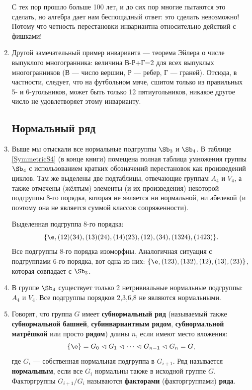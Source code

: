 \begin{enumerate}
С тех пор прошло больше 100 лет, и до сих пор многие пытаются это сделать, но алгебра дает нам беспощадный ответ: это сделать невозможно! Потому что четность перестановки инвариантна относительно действий с фишками!

\item Другой замечательный пример инварианта --- теорема Эйлера о числе выпуклого многогранника: величина В-Р+Г=2 для всех выпуклых многогранников (В --- число вершин, Р --- ребер, Г --- граней). Отсюда, в частности, следует, что на футбольном мяче, сшитом только из правильных 5- и 6-угольников, может быть только 12 пятиугольников, никакое другое число не удовлетворяет этому инварианту.


\subsection*{Нормальный ряд}

\item Выше мы отыскали все нормальные подгруппы $\Sb_3$ и $\Sb_4$. В таблице \ref{SymmetricS4} (в конце книги) помещена полная таблица умножения группы $\Sb_4$ с использованием кратких обозначений перестановок как произведений циклов. Там же выделены две подтаблицы, отвечающие группам $A_4$ и $V_4$, а также отмечены (жёлтым) элементы (и их произведения) некоторой подгруппы 8-го порядка, которая не является ни нормальной, ни абелевой (и поэтому она не является суммой классов сопряженности).

Выделенная подгруппа 8-го порядка:
$$\{\e, (12)(34), (13)(24), (14)(23), (12), (34), (1324), (1423)\}.
$$
Все подгруппы 8-го порядка изоморфны. Аналогичная ситуация с подгруппами 6-го порядка, вот одна из них:
$\{\e, (123), (132), (12), (13), (23) \}$, которая совпадает с $\Sb_3$.

\item В группе $\Sb_4$ существует только 2 нетривиальные нормальные подгруппы: $A_4$ и $V_4$. Все подгруппы порядков 2,3,6,8 не являются нормальными.

\item Говорят, что группа $G$ имеет \textbf{субнормальный ряд} (называемый также \textbf{субнормальной башней}, \textbf{субинвариантным рядом}, \textbf{субнормальной матрёшкой} или просто \textbf{рядом}) длины $n$, если имеют место вложения:
$$
\{\e\}=G_0\vartriangleleft G_1\vartriangleleft\dots\vartriangleleft G_{n-1}\vartriangleleft G_n=G,
$$
где $G_i$ --- собственная нормальная подгруппа в $G_{i+1}$. Ряд называется \textbf{нормальным}, если все $G_i$ нормальны также в исходной группе $G$. Факторгруппы $G_{i+1}/G_i$ называются \textbf{факторами} (факторгруппами) \textbf{ряда}.


\end{enumerate}
